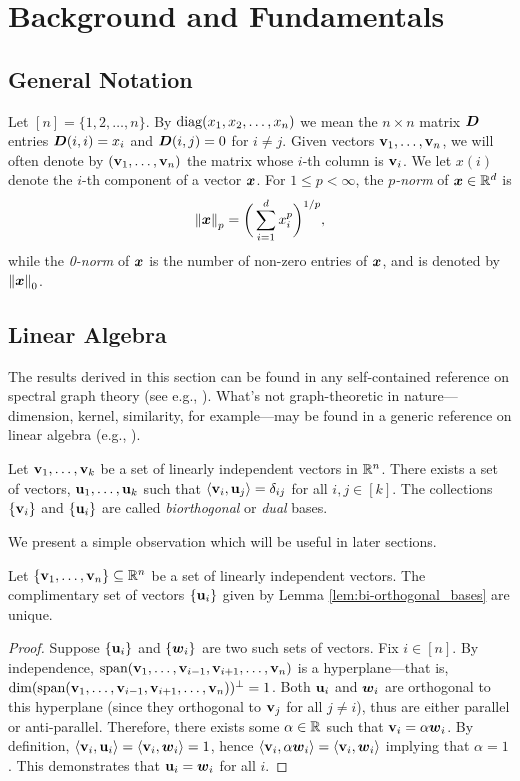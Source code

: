 \chapter{Background and Fundamentals}

\section{General Notation}
\label{sec:background_general}
Let $[n]=\{1,2,\dots,n\}$. By $\text{diag}(x_1,x_2,\dots,x_n)$ we mean the $n\times n$ matrix $\vb*{D}$ entries $\vb*{D}(i,i)=x_i$ and $\vb*{D}(i,j)=0$ for $i\neq j$. Given vectors $\vb{v}_1,\dots,\vb{v}_n$, we will often denote by $(\vb{v}_1,\dots,\vb{v}_n)$ the matrix whose $i$-th column is $\vb{v}_i$. We let $x(i)$ denote the $i$-th component of a vector $\vb*{x}$. For $1\leq p<\infty$, the \emph{$p$-norm} of $\vb*{x}\in \mathbb{R}^d$ is 
\[\norm{\vb*{x}}_p = \bigg(\sum_{i=1}^d x_i^p\bigg)^{1/p},\]
while the \emph{0-norm} of $\vb*{x}$ is the number of non-zero entries of $\vb*{x}$, and is denoted by $\norm{\vb*{x}}_0$. 

\section{Linear Algebra}
\label{sec:background_linear}
The results derived in this section can be found in any self-contained reference on spectral graph theory (see e.g., \cite{spielman2009spectral,chung1997spectral}). What's not graph-theoretic in nature---dimension, kernel, similarity, for example---may be found in a generic reference on linear algebra (e.g.,  \cite{axler1997linear}). 

\begin{lemma}
\label{lem:bi-orthogonal_bases}
Let $\vb{v}_1,\dots,\vb{v}_k$ be a set of linearly independent vectors in $\mathbb{R}^n$. There exists a set of vectors, $\vb{u}_1,\dots,\vb{u}_k$ such that $\langle \vb{v}_i,\vb{u}_j\rangle = \delta_{ij}$ for all $i,j\in[k]$. The collections $\{\vb{v}_i\}$ and $\{\vb{u}_i\}$ are called \emph{biorthogonal} or \emph{dual} bases.  
\end{lemma}

We present a simple observation which will be useful in later sections. 

\begin{observation}
\label{obs:bi-orthogonal_unique}
Let $\{\vb{v}_1,\dots,\vb{v}_n\}\subseteq\mathbb{R}^n$ be a set of linearly independent vectors. The complimentary set of vectors $\{\vb{u}_i\}$ given by Lemma \ref{lem:bi-orthogonal_bases} are unique. 
\end{observation}
\begin{proof}
Suppose $\{\vb{u}_i\}$ and $\{\vb*{w}_i\}$ are two such sets of vectors. Fix $i\in[n]$. By independence, $\textnormal{span}(\vb{v}_1,\dots,\vb{v}_{i-1},\vb{v}_{i+1},\dots,\vb{v}_n)$ is a hyperplane---that is, $\dim(\textnormal{span}(\vb{v}_1,\dots,\vb{v}_{i-1},\vb{v}_{i+1},\dots,\vb{v}_n))^\perp=1$. Both $\vb{u}_i$ and $\vb*{w}_i$ are orthogonal to this hyperplane (since they orthogonal to $\vb{v}_j$ for all $j\neq i$), thus are either parallel or anti-parallel. Therefore, there exists some $\alpha\in\mathbb{R}$ such that $\vb{v}_i=\alpha\vb*{w}_i$. By definition, $\langle \vb{v}_i,\vb{u}_i\rangle = \langle \vb{v}_i,\vb*{w}_i\rangle =1$, hence $\langle \vb{v}_i,\alpha \vb*{w}_i\rangle = \langle \vb{v}_i,\vb*{w}_i\rangle$ implying that $\alpha=1$. This demonstrates that $\vb{u}_i=\vb*{w}_i$ for all $i$. 
\end{proof}

